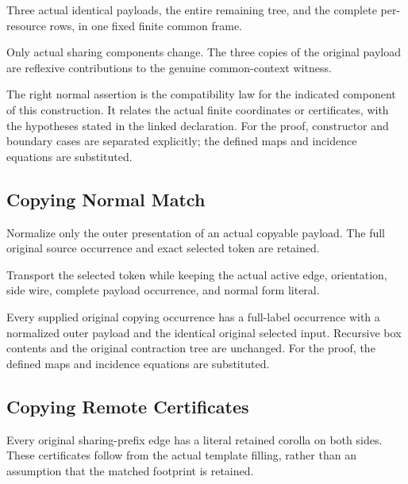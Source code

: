 Three actual identical payloads, the entire remaining tree, and the complete per-resource rows, in one fixed finite common frame.
\par{}

Only actual sharing components change. The three copies of the original payload are reflexive contributions to the genuine common-context witness.
\par{}

The right normal assertion is the compatibility law for the indicated component of this construction. It relates the actual finite coordinates or certificates, with the hypotheses stated in the linked declaration.
For the proof, constructor and boundary cases are separated explicitly; the defined maps and incidence equations are substituted.
\par{}

\subsection{Copying Normal Match}
Normalize only the outer presentation of an actual copyable payload. The full original source occurrence and exact selected token are retained.

Transport the selected token while keeping the actual active edge, orientation, side wire, complete payload occurrence, and normal form literal.
\par{}

Every supplied original copying occurrence has a full-label occurrence with a normalized outer payload and the identical original selected input. Recursive box contents and the original contraction tree are unchanged.
For the proof, the defined maps and incidence equations are substituted.
\par{}

\subsection{Copying Remote Certificates}
Every original sharing-prefix edge has a literal retained corolla on both sides. These certificates follow from the actual template filling, rather than an assumption that the matched footprint is retained.

